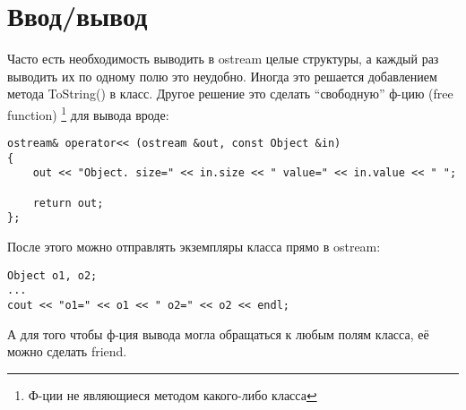 \section{Ввод/вывод}

Часто есть необходимость выводить в ostream целые структуры, а каждый раз выводить их по одному полю это
неудобно. Иногда это решается добавлением метода ToString() в класс. 
Другое решение это сделать ``свободную'' ф-цию (free function)
\footnote{Ф-ции не являющиеся методом какого-либо класса} для вывода вроде:

\begin{lstlisting}
ostream& operator<< (ostream &out, const Object &in)
{
    out << "Object. size=" << in.size << " value=" << in.value << " ";

    return out;
};
\end{lstlisting}

После этого можно отправлять экземпляры класса прямо в ostream:

\begin{lstlisting}
Object o1, o2;
...
cout << "o1=" << o1 << " o2=" << o2 << endl;
\end{lstlisting}

А для того чтобы ф-ция вывода могла обращаться к любым полям класса, её можно сделать friend.

